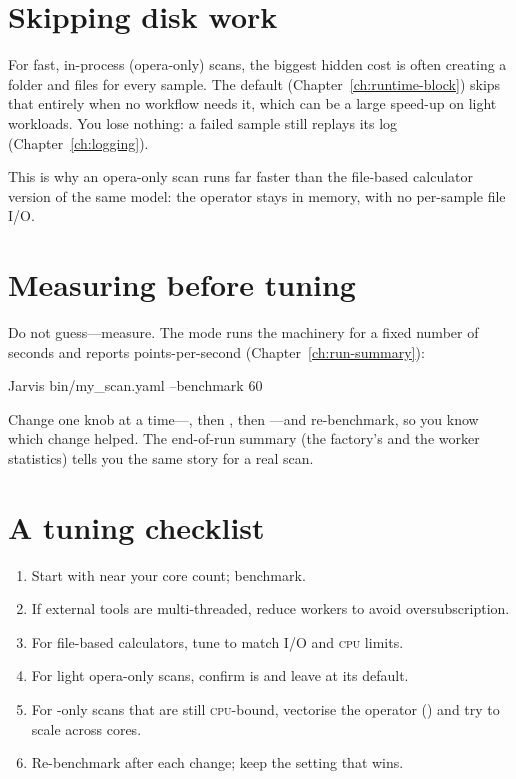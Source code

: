 \section{Skipping disk work}
\label{sec:perf-artifacts}

For fast, in-process (opera-only) scans, the biggest hidden cost is often creating a folder and
files for every sample. The default 
(Chapter~\ref{ch:runtime-block}) skips that entirely when no workflow needs it, which can be a
large speed-up on light workloads. You lose nothing: a failed sample still replays its log
(Chapter~\ref{ch:logging}).

\begin{jnote}
This is why an opera-only  scan runs far faster than the file-based calculator
version of the same model: the operator stays in memory, with no per-sample file I/O.
\end{jnote}

\section{Measuring before tuning}
\label{sec:perf-benchmark}

Do not guess---measure. The  mode runs the machinery for a fixed number of
seconds and reports points-per-second (Chapter~\ref{ch:run-summary}):

\begin{shellbox}
Jarvis bin/my_scan.yaml --benchmark 60
\end{shellbox}

\noindent Change one knob at a time---, then ,
then ---and re-benchmark, so you know which change helped. The end-of-run
summary (the factory's  and the worker statistics) tells you the same story for a
real scan.

\section{A tuning checklist}
\label{sec:perf-checklist}

\begin{enumerate}
  \item Start with  near your core count; benchmark.
  \item If external tools are multi-threaded, reduce workers to avoid oversubscription.
  \item For file-based calculators, tune  to match I/O and
        \textsc{cpu} limits.
  \item For light opera-only scans, confirm  is  and leave
         at its default.
  \item For -only scans that are still \textsc{cpu}-bound, vectorise the operator
        () and try  to scale across cores.
  \item Re-benchmark after each change; keep the setting that wins.
\end{enumerate}

